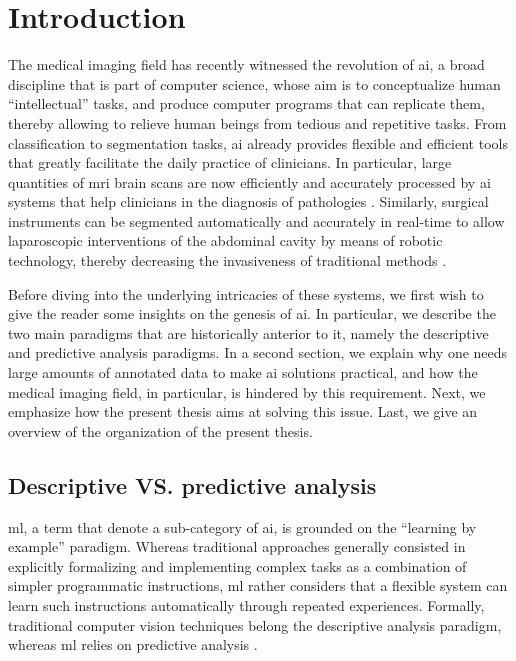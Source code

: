 \glsresetall

\chapter{Introduction}
\label{intro}

The medical imaging field has recently witnessed the revolution of \gls{ai}, a broad discipline that is part of computer science, whose aim is to conceptualize human ``intellectual'' tasks, and produce computer programs that can replicate them, thereby allowing to relieve human beings from tedious and repetitive tasks.
From classification to segmentation tasks, \gls{ai} already provides flexible and efficient tools that greatly facilitate the daily practice of clinicians.
In particular, large quantities of \gls{mri} brain scans are now efficiently and accurately processed by \gls{ai} systems that help clinicians in the diagnosis of pathologies \cite{sun19}.
Similarly, surgical instruments can be segmented automatically and accurately in real-time to allow laparoscopic interventions of the abdominal cavity by means of robotic technology, thereby decreasing the invasiveness of traditional methods \cite{davinci}.

Before diving into the underlying intricacies of these systems, we
first wish to give the reader some insights on the genesis of \gls{ai}.
In particular, we describe the two main paradigms that are historically anterior to it, namely the descriptive and predictive analysis paradigms.
In a second section, we explain why one needs large amounts of annotated data to make \gls{ai} solutions practical, and how the medical imaging field, in particular, is hindered by this requirement.
Next, we emphasize how the present thesis aims at solving this issue.
Last, we give an overview of the organization of the present thesis.

\section{Descriptive VS. predictive analysis}
\Gls{ml}, a term that denote a sub-category of \gls{ai}, is grounded on the ``learning by example'' paradigm.
Whereas traditional approaches generally consisted in explicitly formalizing and implementing complex tasks as a combination of simpler programmatic instructions,
\gls{ml} rather considers that a flexible system can learn such instructions automatically through repeated experiences.
Formally, traditional computer vision techniques belong the descriptive analysis paradigm, whereas \gls{ml} relies on predictive analysis \cite{omahony19}.

